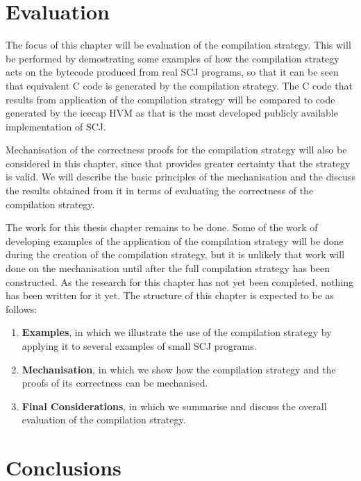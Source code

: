 \documentclass[a4paper,10pt]{report}
\let\olditem\item
\renewcommand{\item}[1][]{\olditem{\bfseries #1}}
\begin{document}
\section{Evaluation}

The focus of this chapter will be evaluation of the compilation
strategy.
This will be performed by demostrating some examples of how the
compilation strategy acts on the bytecode produced from real SCJ
programs, so that it can be seen that equivalent C code is generated
by the compilation strategy.
The C code that results from application of the compilation strategy
will be compared to code generated by the icecap HVM as that is the
most developed publicly available implementation of SCJ.

Mechanisation of the correctness proofs for the compilation strategy
will also be considered in this chapter, since that provides greater
certainty that the strategy is valid.
We will describe the basic principles of the mechanisation and the
discuss the results obtained from it in terms of evaluating the
correctness of the compilation strategy.

The work for this thesis chapter remains to be done.
Some of the work of developing examples of the application of the
compilation strategy will be done during the creation of the
compilation strategy, but it is unlikely that work will done on the
mechanisation until after the full compilation strategy has been
constructed.
As the research for this chapter has not yet been completed, nothing
has been written for it yet.
The structure of this chapter is expected to be as follows:
\begin{enumerate}
\item[Examples], in which we illustrate the use of the compilation
  strategy by applying it to several examples of small SCJ programs.
\item[Mechanisation], in which we show how the compilation strategy
  and the proofs of its correctness can be mechanised.
\item[Final Considerations], in which we summarise and discuss the
  overall evaluation of the compilation strategy.
\end{enumerate}

\section{Conclusions}
\end{document}
